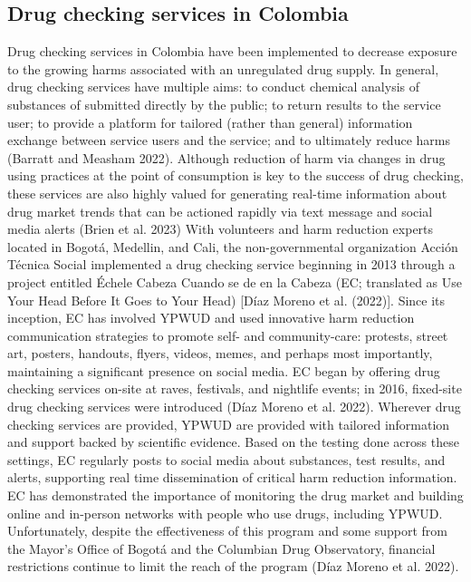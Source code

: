 \documentclass[
  letterpaper,
  DIV=11,
  numbers=noendperiod]{scrartcl}
\begin{document}
\subsection{Drug checking services in Colombia}\label{sec-drug-checking}

Drug checking services in Colombia have been implemented to decrease
exposure to the growing harms associated with an unregulated drug
supply. In general, drug checking services have multiple aims: to
conduct chemical analysis of substances of submitted directly by the
public; to return results to the service user; to provide a platform for
tailored (rather than general) information exchange between service
users and the service; and to ultimately reduce harms (Barratt and
Measham 2022). Although reduction of harm via changes in drug using
practices at the point of consumption is key to the success of drug
checking, these services are also highly valued for generating real-time
information about drug market trends that can be actioned rapidly via
text message and social media alerts (Brien et al. 2023) With volunteers
and harm reduction experts located in Bogotá, Medellin, and Cali, the
non-governmental organization Acción Técnica Social implemented a drug
checking service beginning in 2013 through a project entitled Échele
Cabeza Cuando se de en la Cabeza (EC; translated as Use Your Head Before
It Goes to Your Head) {[}Díaz Moreno et al. (2022){]}. Since its
inception, EC has involved YPWUD and used innovative harm reduction
communication strategies to promote self- and community-care: protests,
street art, posters, handouts, flyers, videos, memes, and perhaps most
importantly, maintaining a significant presence on social media. EC
began by offering drug checking services on-site at raves, festivals,
and nightlife events; in 2016, fixed-site drug checking services were
introduced (Díaz Moreno et al. 2022). Wherever drug checking services
are provided, YPWUD are provided with tailored information and support
backed by scientific evidence. Based on the testing done across these
settings, EC regularly posts to social media about substances, test
results, and alerts, supporting real time dissemination of critical harm
reduction information. EC has demonstrated the importance of monitoring
the drug market and building online and in-person networks with people
who use drugs, including YPWUD. Unfortunately, despite the effectiveness
of this program and some support from the Mayor's Office of Bogotá and
the Columbian Drug Observatory, financial restrictions continue to limit
the reach of the program (Díaz Moreno et al. 2022).
\end{document}
